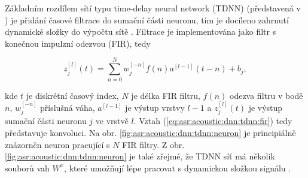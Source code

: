 Základním rozdílem sítí typu time-delay neural network (TDNN) (představená v \cite{Waibel1989}) je přidání časové filtrace do sumační části neuronu, tím je docíleno zahrnutí dynamické složky do výpočtu sítě \cite{Craig2000}. Filtrace je implementována jako filtr s konečnou impulzní odezvou (FIR), tedy

\begin{equation}
  z_{j}^{[l]}\left(t\right) = \sum_{n=0}^{N} w_{j}^{[-n]}f\left(n\right)a^{[l-1]}\left(t - n\right) + b_{j},
  \label{eq:asr:acoustic:dnn:tdnn:fir}
\end{equation}

\noindent kde $t$ je diskrétní časový index, $N$ je délka FIR filtru, $f\left(n\right)$ odezva filtru v bodě $n$, $w_{j}^{[-n]}$ příslušná váha, $a^{[l-1]}$ je výstup vrstvy $l-1$ a $z_{j}^{[l]}\left(t\right)$ je výstup sumační části neuronu $j$ ve vrstvě $l$. Vztah (\ref{eq:asr:acoustic:dnn:tdnn:fir}) tedy představuje konvoluci. Na obr. \ref{fig:asr:acoustic:dnn:tdnn:neuron} je principiálně znázorněn neuron pracující s $N$ FIR filtry. Z obr. \ref{fig:asr:acoustic:dnn:tdnn:neuron} je také zřejmé, že TDNN síť má několik souborů vah $W^{x}$, které umožňují lépe pracovat s dynamickou složkou signálu \cite{Peddinti2015}.

